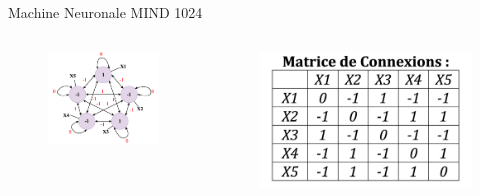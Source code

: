 \documentclass{beamer}
\begin{document}
\begin{frame}{Machine Neuronale MIND 1024}
    \begin{columns}[T]
        \begin{figure}
            \centering
            \includegraphics[width=1.25\linewidth]{pic/network2.png}
        \end{figure}
            \begin{figure}
            \centering
            \includegraphics[width=0.8\linewidth]{pic/matrix.png}
            \end{figure}
    \end{columns}
\end{frame}
\end{document}
